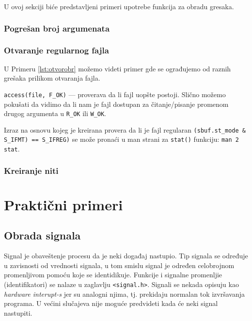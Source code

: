 \documentclass[a4paper, 11pt, twoside]{article}
\newcommand{\scode}[3] {
	\hspace{.06\textwidth} 
	\begin{minipage}[t]{.88\textwidth} %
		\begin{mdframed}[topline=true,bottomline=true,leftline=true,rightline=true,backgroundcolor=gray!22, linecolor=gray!60!black,roundcorner=1mm]
			 

	\begin{center}
		\caption{\textbf{Primer \ref{lst:#3}:} #2}
	\end{center}
	\end{mdframed}
	\end{minipage}

}
\begin{document}
U ovoj sekciji biće predstavljeni primeri upotrebe funkcija za obradu gresaka.

\subsubsection{Pogrešan broj argumenata}

\scode{wnarg.c}{Pogresan broj argumenata}{wnarg}

\subsubsection{Otvaranje regularnog fajla}

U Primeru \ref{lst:otvorobr} možemo videti primer gde se ograđujemo od raznih grešaka prilikom otvaranja fajla.

\scode{openerchk.c}{Otvaranje regularnog fajla}{otvorobr}
\vspace{2mm} 

\texttt{access(file, F\_OK)} --- proverava da li fajl uopšte postoji. Slično možemo pokušati da vidimo da li nam je fajl dostupan za čitanje/pisanje promenom drugog argumenta u \texttt{R\_OK} ili \texttt{W\_OK}.

Izraz na osnovu kojeg je kreirana provera da li je fajl regularan \texttt{(sbuf.st\_mode \& S\_IFMT) == S\_IFREG)} se može pronaći u man strani za \texttt{stat()} funkciju: \texttt{man 2 stat}.

\subsubsection{Kreiranje niti}

\scode{pthcrer.c}{Obrada greske za funkcije koje rade sa threadovima}{pthcrer}


 

\newpage

\section{Praktični primeri}

\subsection{Obrada signala}

Signal je obaveštenje procesu da je neki događaj nastupio. Tip signala se određuje u zavisnosti od vrednosti signala, u tom smislu signal je određen celobrojnom promenljivom pomoću koje se identidikuje. Funkcije i signalne promenljie (identifikatori) se nalaze u zaglavlju \texttt{<signal.h>}. Signali se nekada opisuju kao \emph{hardware interupt-s} jer su analogni njima, tj. prekidaju normalan tok izvršavanja programa. U većini slučajeva nije moguće predvideti kada će neki signal nastupiti.
\end{document}
